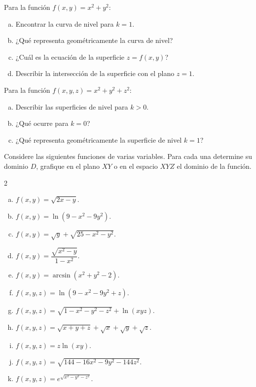 \begin{prob}
Para la función $f(x,y) = x^2 + y^2$:
\begin{enumerate}[a)]
  \item Encontrar la curva de nivel para $k=1$.
  \item ¿Qué representa geométricamente la curva de nivel?
  \item ¿Cuál es la ecuación de la superficie $z = f(x,y)$?
  \item Describir la intersección de la superficie con el plano $z=1$.
\end{enumerate}
\end{prob}

\begin{prob}
Para la función $f(x,y,z) = x^2 + y^2 + z^2$:
\begin{enumerate}[a)]
  \item Describir las superficies de nivel para $k>0$.
  \item ¿Qué ocurre para $k=0$?
  \item ¿Qué representa geométricamente la superficie de nivel $k=1$?
\end{enumerate}
\end{prob}


\begin{prob}
Considere las siguientes funciones de varias variables. Para cada una determine su dominio $D$, grafique en el plano $XY$ o en el espacio $XYZ$ el dominio de la función.
\begin{multicols}{2}
\begin{enumerate}[(a)]
    \item $f(x,y)=\sqrt{2x-y}.$
    \item $f(x,y)=\ln\left(9-x^2-9y^2\right).$
    \item $f(x,y)=\sqrt{y}+\sqrt{25-x^2-y^2}.$
    \item $f(x,y)=\dfrac{\sqrt{x^2-y}}{1-x^2}.$
    \item $f(x,y)=\arcsin\left( x^2+y^2-2 \right).$
    \item $f(x,y,z)=\ln\left(9-x^2-9y^2+z\right).$
    \item $f(x,y,z)=\sqrt{1-x^2-y^2-z^2}+\ln(xyz).$
    \item $f(x,y,z)=\sqrt{x+y+z}+\sqrt{x}+\sqrt{y}+\sqrt{z}.$
    \item $f(x,y,z)=z\ln(xy).$
    \item $f(x,y,z)=\sqrt{144-16x^2-9y^2-144z^2}.$
    \item $f(x,y,z)=e^{\sqrt{x^2-y^2-z^2}}.$
\end{enumerate}
\end{multicols}
\end{prob}



